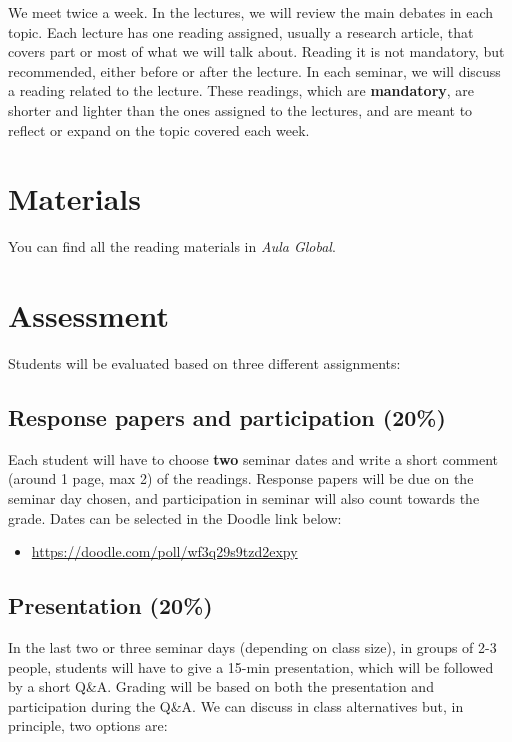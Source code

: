 \documentclass[12pt, a4paper]{article}
\begin{document}
We meet twice a week. In the lectures, we will review the main debates in each topic. Each lecture has one reading assigned, usually a research article, that covers part or most of what we will talk about. Reading it is not mandatory, but recommended, either before or after the lecture. In each seminar, we will discuss a reading related to the lecture. These readings, which are \textbf{mandatory}, are shorter and lighter than the ones assigned to the lectures, and are meant to reflect or expand on the topic covered each week.

\section{Materials}

You can find all the reading materials in \textit{Aula Global}.

\newpage
\section{Assessment}

Students will be evaluated based on three different assignments:

\subsection*{Response papers and participation (20\%)}

Each student will have to choose \textbf{two} seminar dates and write a short comment (around 1 page, max 2) of the readings. Response papers will be due on the seminar day chosen, and participation in seminar will also count towards the grade. Dates can be selected in the Doodle link below:

\begin{itemize}
\setlength\itemsep{0pt}
\item[] \href{https://doodle.com/poll/wf3q29s9tzd2expy}{https://doodle.com/poll/wf3q29s9tzd2expy}
\end{itemize}

\subsection*{Presentation (20\%)}

In the last two or three seminar days (depending on class size), in groups of 2-3 people, students will have to give a 15-min presentation, which will be followed by a short Q\&A. Grading will be based on both the presentation and participation during the Q\&A. We can discuss in class alternatives but, in principle, two options are:
\end{document}
